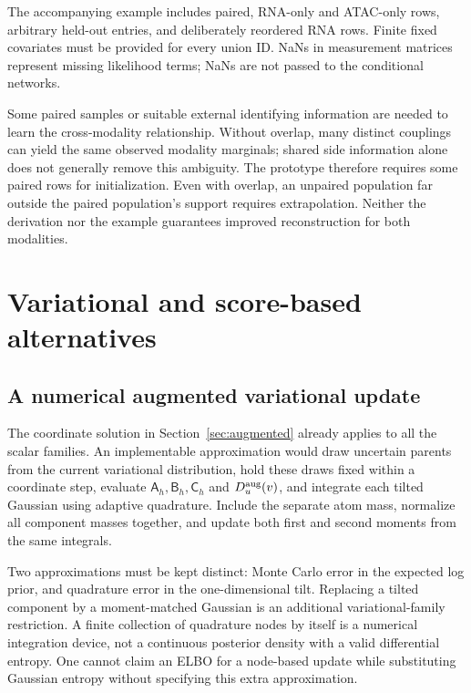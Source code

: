The accompanying example includes paired, RNA-only and ATAC-only rows,
arbitrary held-out entries, and deliberately reordered RNA rows. Finite
fixed covariates must be provided for every union ID. NaNs in measurement
matrices represent missing likelihood terms; NaNs are not passed to the
conditional networks.

Some paired samples or suitable external identifying information are
needed to learn the cross-modality relationship. Without overlap, many
distinct couplings can yield the same observed modality marginals; shared
side information alone does not generally remove this ambiguity. The
prototype therefore requires some paired rows for initialization. Even
with overlap, an unpaired population far outside the paired population's
support requires extrapolation. Neither the derivation nor the example
guarantees improved reconstruction for both modalities.

\section{Variational and score-based alternatives}
\label{sec:approximation}
\subsection{A numerical augmented variational update}
The coordinate solution in Section~\ref{sec:augmented} already applies
to all the scalar families. An implementable approximation would draw
uncertain parents from the current variational distribution, hold these
draws fixed within a coordinate step, evaluate
\(\mathsf A_h,\mathsf B_h,\mathsf C_h\) and \(D_u^{\rm aug}(v)\), and
integrate each tilted Gaussian using adaptive quadrature. Include
the separate atom mass, normalize all component masses together, and
update both first and second moments from the same integrals.

Two approximations must be kept distinct: Monte Carlo error in the
expected log prior, and quadrature error in the one-dimensional tilt.
Replacing a tilted component by a moment-matched Gaussian is an
additional variational-family restriction. A finite collection of
quadrature nodes by itself is a numerical integration device, not a
continuous posterior density with a valid differential entropy.
One cannot claim an ELBO for a node-based update while substituting
Gaussian entropy without specifying this extra approximation.

